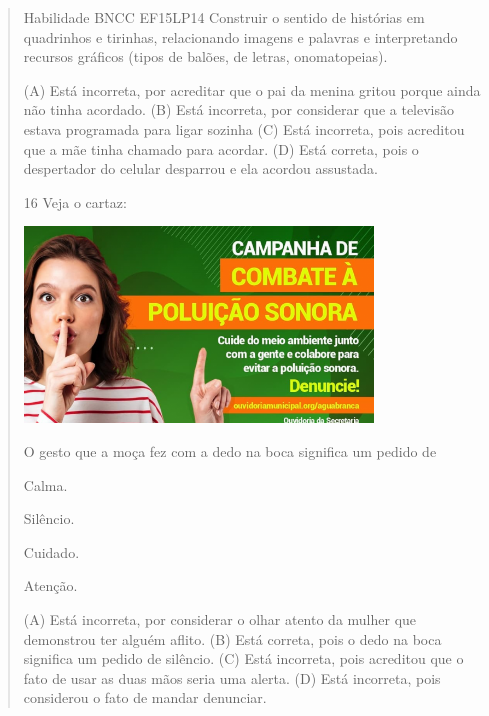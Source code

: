 \begin{verse}
{Habilidade BNCC EF15LP14 Construir o sentido de histórias em quadrinhos
e tirinhas, relacionando imagens e palavras e interpretando recursos
gráficos (tipos de balões, de letras, onomatopeias).}

(A) Está incorreta, por acreditar que o pai da menina gritou porque ainda não tinha acordado.
(B) Está incorreta, por considerar que a televisão estava programada para ligar sozinha
(C) Está incorreta, pois acreditou que a mãe tinha chamado para acordar.
(D) Está correta, pois o despertador do celular desparrou e ela acordou assustada.

\num{16} Veja o cartaz:

\includegraphics[width=3.64744in,height=2.05233in]{media/image173.png}


O gesto que a moça fez com a dedo na boca significa um pedido de

\begin{minipage}{.5\textwidth}
\begin{escolha}
\item Calma.

\item Silêncio.

\item Cuidado.

\item Atenção.
\end{escolha}
\end{minipage}

(A) Está incorreta, por considerar o olhar atento da mulher que demonstrou ter alguém aflito.
(B) Está correta, pois o dedo na boca significa um pedido de silêncio.
(C) Está incorreta, pois acreditou que o fato de usar as duas mãos seria uma alerta.
(D) Está incorreta, pois considerou o fato de mandar denunciar.


\end{verse}
